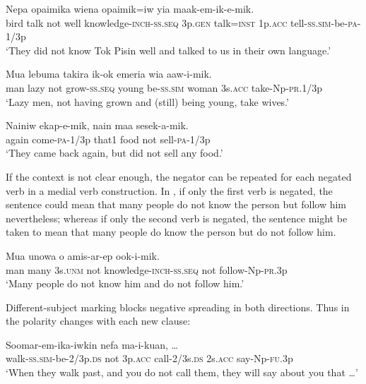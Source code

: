 \ea%
\label{ex:6:x1156}
\gll Nepa  opaimika        wiena opaimik=iw  yia  maak-em-ik-e-mik.\\
bird  talk  not  well  knowledge-\textsc{inch}-\textsc{ss}.\textsc{seq}  3p.\textsc{gen} talk=\textsc{inst}  1p.\textsc{acc}  tell-\textsc{ss}.\textsc{sim}-be-\textsc{pa}-1/3p\\
\glt `They did not know Tok Pisin well and talked to us in their own language.'
\z

\ea%
\label{ex:6:x1763}
\gll Mua  lebuma      takira  ik-ok  emeria wia  aaw-i-mik.\\
man  lazy  not  grow-\textsc{ss}.\textsc{seq}  young  be-\textsc{ss}.\textsc{sim}  woman 3s.\textsc{acc}  take-Np-\textsc{pr}.1/3p\\
\glt `Lazy men, not having grown and (still) being young, take wives.'
\z

\ea%
\label{ex:6:x1153}
\gll Nainiw  ekap-e-mik,  nain  maa    sesek-a-mik. \\
again  come-\textsc{pa}-1/3p  that1  food  not  sell-\textsc{pa}-1/3p\\
\glt `They came back again, but did not sell any food.'
\z

If the context is not clear enough, the negator can be repeated for each negated verb in a medial verb construction. In , if only the first verb is negated, the sentence could mean that many people do not know the person but follow him nevertheless; whereas if only the second verb is negated, the sentence might be taken to mean that many people do know the person but do not follow him. 

\ea%
\label{ex:6:x1139}
\gll Mua  unowa  o    amis-ar-ep   ook-i-mik.\\
man  many  3s.\textsc{unm}  not  knowledge-\textsc{inch}-\textsc{ss}.\textsc{seq} not  follow-Np-\textsc{pr}.3p\\
\glt `Many people do not know him and do not follow him.'
\z

Different-subject marking blocks negative spreading in both directions. Thus in  the polarity changes with each new clause:

\ea%
\label{ex:6:x1141}
\gll Soomar-em-ika-iwkin      nefa  ma-i-kuan, {\dots}\\
walk-\textsc{ss}.\textsc{sim}-be-2/3p.\textsc{ds}  not  3p.\textsc{acc}  call-2/3s.\textsc{ds} 2s.\textsc{acc}  say-Np-\textsc{fu}.3p\\
\glt `When they walk past, and you do not call them, they will say about you that {\dots}'
\z

